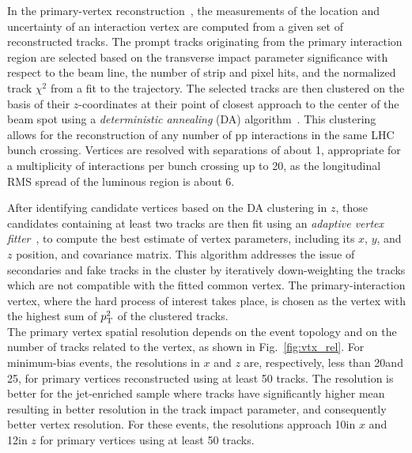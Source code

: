 In the primary-vertex reconstruction~\cite{Speer:927395}, the measurements of the location and uncertainty of an interaction vertex are computed from a given set of reconstructed tracks. The prompt tracks originating from the primary interaction region are selected based on the transverse impact parameter significance with respect to the beam line, the number of strip and pixel hits, and the normalized track $\chi^2$ from a fit to the trajectory. The selected tracks are then clustered on the basis of their $z$-coordinates at their point of closest approach to the center of the beam spot using a \textit{deterministic annealing} (DA) algorithm~\cite{726788}.
This clustering allows for the reconstruction of any number of pp interactions in the same LHC bunch crossing. Vertices are resolved with separations of about 1\mm, appropriate for a multiplicity of interactions per bunch crossing up to 20, as the longitudinal RMS spread of the luminous region is about 6\cm.

After identifying candidate vertices based on the DA clustering in $z$, those candidates containing at least two tracks are then fit using an \textit{adaptive vertex fitter}~\cite{0954-3899-34-12-N01}, to compute the best
estimate of vertex parameters, including its $x$, $y$, and $z$ position, and covariance matrix. This algorithm addresses the issue of secondaries and fake tracks in the cluster by iteratively down-weighting the tracks which are not compatible with the fitted common vertex. The primary-interaction vertex, where the hard process of interest takes place, is chosen as the vertex with the highest sum of $p_{\mathrm{T}}^2$ of the clustered tracks.\\

The primary vertex spatial resolution depends on the event topology and on the number of tracks related to the vertex, as shown in Fig.~\ref{fig:vtx_rel}. For minimum-bias events, the resolutions in $x$ and $z$ are, respectively, less than 20\mum and 25\mum, for primary vertices reconstructed using at least 50 tracks. The resolution is better for the jet-enriched sample where tracks have significantly higher mean \pt resulting in better resolution in the track impact parameter, and consequently better vertex resolution. For these events, the resolutions approach 10\mum in $x$ and 12\mum in $z$ for primary vertices using at least 50 tracks.\\

